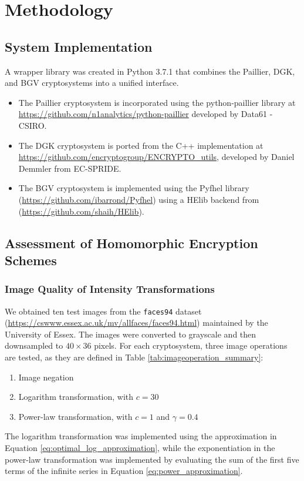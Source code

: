 \section{Methodology}
\label{sec:chapter_3}
\subsection{System Implementation}
A wrapper library was created in Python 3.7.1 that combines the Paillier, DGK, and BGV cryptosystems into a unified interface.
\begin{itemize}
	\item The Paillier cryptosystem is incorporated using the python-paillier library at \url{https://github.com/n1analytics/python-paillier} developed by Data61 - CSIRO.
	\item The DGK cryptosystem is ported from the C++ implementation at \url{https://github.com/encryptogroup/ENCRYPTO_utils}, developed by Daniel Demmler from EC-SPRIDE.
	\item The BGV cryptosystem is implemented using the Pyfhel library (\url{https://github.com/ibarrond/Pyfhel}) using a HElib backend from (\url{https://github.com/shaih/HElib}).
\end{itemize}

\subsection{Assessment of Homomorphic Encryption Schemes}
\subsubsection{Image Quality of Intensity Transformations}
We obtained ten test images from the \texttt{faces94} dataset (\url{https://cswww.essex.ac.uk/mv/allfaces/faces94.html}) maintained by the University of Essex. The images were converted to grayscale and then downsampled to $40 \times 36$ pixels.
For each cryptosystem, three image operations are tested, as they are defined in Table \ref{tab:imageoperation_summary}:
\begin{enumerate}
	\item Image negation
	\item Logarithm transformation, with $c = 30$
	\item Power-law transformation, with $c = 1$ and $\gamma = 0.4$
\end{enumerate}
The logarithm transformation was implemented using the approximation in Equation \ref{eq:optimal_log_approximation}, while the exponentiation in the power-law transformation was implemented by evaluating the sum of the first five terms of the infinite series in Equation \ref{eq:power_approximation}.

